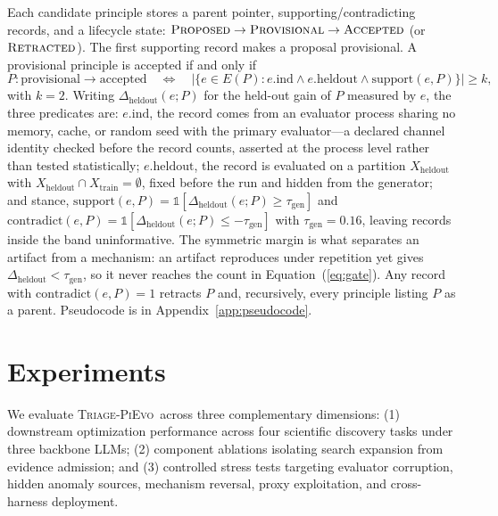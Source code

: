 \documentclass{article}
\newcommand{\method}{\textsc{Triage-PiEvo}\,}
\begin{document}
Each candidate principle stores a parent pointer, supporting/contradicting records, and a lifecycle state: $\textsc{Proposed} \to \textsc{Provisional} \to \textsc{Accepted}$ (or $\textsc{Retracted}$). The first supporting record makes a proposal provisional. A provisional principle is accepted if and only if
\begin{equation}
 P:\mathrm{provisional}\rightarrow\mathrm{accepted}
 \quad\Longleftrightarrow\quad
 \left|\{e\in E(P):e.\mathrm{ind}\wedge e.\mathrm{heldout}\wedge \mathrm{support}(e,P)\}\right|\geq k,
 \label{eq:gate}
\end{equation}
with $k=2$. Writing $\Delta_{\mathrm{heldout}}(e;P)$ for the held-out gain of $P$ measured by $e$, the three predicates are: $e.\mathrm{ind}$, the record comes from an evaluator process sharing no memory, cache, or random seed with the primary evaluator---a declared channel identity checked before the record counts, asserted at the process level rather than tested statistically; $e.\mathrm{heldout}$, the record is evaluated on a partition $X_{\mathrm{heldout}}$ with $X_{\mathrm{heldout}} \cap X_{\mathrm{train}} = \emptyset$, fixed before the run and hidden from the generator; and stance, $\mathrm{support}(e,P) = \mathbb{1}[\Delta_{\mathrm{heldout}}(e;P) \ge \tau_{\mathrm{gen}}]$ and $\mathrm{contradict}(e,P) = \mathbb{1}[\Delta_{\mathrm{heldout}}(e;P) \le -\tau_{\mathrm{gen}}]$ with $\tau_{\mathrm{gen}}=0.16$, leaving records inside the band uninformative. The symmetric margin is what separates an artifact from a mechanism: an artifact reproduces under repetition yet gives $\Delta_{\mathrm{heldout}} < \tau_{\mathrm{gen}}$, so it never reaches the count in Equation~(\ref{eq:gate}). Any record with $\mathrm{contradict}(e,P)=1$ retracts $P$ and, recursively, every principle listing $P$ as a parent. Pseudocode is in Appendix~\ref{app:pseudocode}.

\section{Experiments}
\label{sec:experiments}

We evaluate \method{} across three complementary dimensions: (1) downstream optimization performance across four scientific discovery tasks under three backbone LLMs; (2) component ablations isolating search expansion from evidence admission; and (3) controlled stress tests targeting evaluator corruption, hidden anomaly sources, mechanism reversal, proxy exploitation, and cross-harness deployment.
\end{document}
